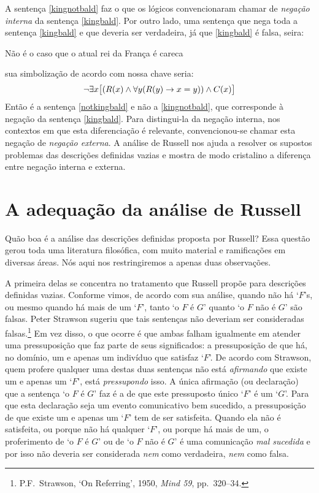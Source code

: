 A sentença \ref{kingnotbald} faz o que os lógicos convencionaram chamar de  \emph{negação interna} da sentença \ref{kingbald}.
Por outro lado, uma sentença que nega toda a sentença \ref{kingbald} e que deveria ser verdadeira, já que \ref{kingbald} é falsa, seira:
	\begin{earg}
		\item[\ex{notkingbald}] Não é o caso que o atual rei da França é careca
	\end{earg}
sua simbolização de acordo com nossa chave seria:
$$\neg\exists x \bigl[(\mathord{R}(x) \wedge \forall y (\mathord{R}(y) \rightarrow x = y)) \wedge \mathord{C}(x)\bigr]$$
Então é a sentença \ref{notkingbald} e não a \ref{kingnotbald}, que corresponde à negação da sentença \ref{kingbald}.
Para distingui-la da negação interna, nos contextos em que esta diferenciação é relevante, convencionou-se chamar esta negação de \emph{negação externa}.
A análise de Russell nos ajuda a resolver os supostos problemas das descrições definidas vazias e mostra de modo cristalino a diferença entre negação interna e externa.


\section{A adequação da análise de Russell}
Quão boa é a análise das descrições definidas proposta por Russell?
Essa questão gerou toda uma literatura filosófica, com muito material e ramificações em diversas áreas.
Nós aqui nos restringiremos a apenas duas observações.

A primeira delas se concentra no tratamento que Russell propõe para descrições definidas vazias.
Conforme vimos, de acordo com sua análise, quando não há `$F$'s, ou mesmo quando há mais de um `$F$', tanto `o $F$ é $G$' quanto `o $F$ não é $G$' são falsas.
Peter Strawson sugeriu que tais sentenças não deveriam ser consideradas falsas.\footnote{
	P.F.\ Strawson, `On Referring', 1950, \emph{Mind 59}, pp.\ 320--34.}
Em vez disso, o que ocorre é que ambas falham igualmente em atender uma pressuposição que faz parte de seus significados: a pressuposição de que há, no domínio, um e apenas um indivíduo que satisfaz `$F$'.
De acordo com Strawson, quem profere qualquer uma destas duas sentenças não está \emph{afirmando} que existe um e apenas um `$F$', está \emph{pressupondo} isso. A única afirmação (ou declaração) que a sentença `o $F$ é $G$' faz é a de que este pressuposto único `$F$' é um `$G$'.
Para que esta declaração seja um evento comunicativo bem sucedido, a pressuposição de que existe um e apenas um `$F$' tem de ser satisfeita.
Quando ela não é satisfeita, ou porque não há qualquer `$F$', ou porque há mais de um, o proferimento de `o $F$ é $G$' ou de `o $F$ não é $G$' é uma comunicação \emph{mal sucedida} e por isso não deveria ser considerada \emph{nem} como verdadeira, \emph{nem} como falsa.

